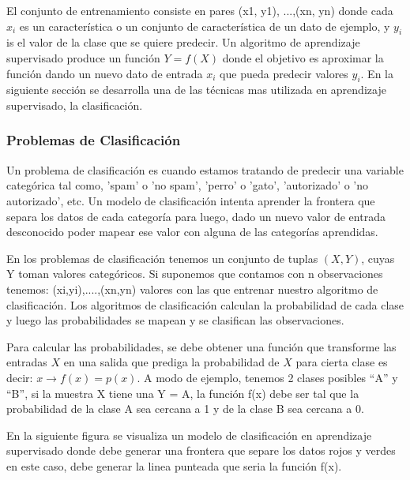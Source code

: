 El conjunto de entrenamiento consiste en pares (x1, y1), ...,(xn, yn) donde cada $x_i$  es un característica o un conjunto de característica de un dato de ejemplo, y $y_i$ is el valor de la clase que se quiere predecir. Un algoritmo de aprendizaje supervisado produce un función $Y = f(X)$ donde el objetivo es aproximar la función dando un nuevo dato de entrada $x_i$ que pueda predecir valores $y_i$. En la siguiente sección se desarrolla una de las técnicas mas utilizada en aprendizaje supervisado, la clasificación.


\subsubsection{Problemas de Clasificación}

Un problema de clasificación es cuando estamos tratando de predecir una variable categórica tal como, 'spam' o 'no spam', 'perro' o 'gato', 'autorizado' o 'no autorizado', etc. Un modelo de clasificación intenta aprender la frontera que separa los datos de cada categoría para luego, dado un nuevo valor de entrada desconocido poder mapear ese valor con alguna de las categorías aprendidas.

En los problemas de clasificación tenemos un conjunto de tuplas $(X,Y)$, cuyas Y toman valores categóricos. Si suponemos que contamos con n observaciones tenemos: (xi,yi),....,(xn,yn) valores con las que entrenar nuestro algoritmo de clasificación. Los algoritmos de clasificación  calculan la probabilidad de cada clase y luego las probabilidades se mapean y se clasifican las observaciones.

Para calcular las probabilidades, se debe obtener una función que transforme las entradas $X$ en una salida que prediga la probabilidad de $X$ para cierta clase es decir: $ x \longrightarrow f(x) = p(x) $. A modo de ejemplo,  tenemos 2 clases posibles “A” y “B”, si la muestra X tiene una Y = A, la función f(x) debe ser tal que la probabilidad de la clase A sea cercana a 1 y  de la clase B sea cercana a 0.

En la siguiente figura se visualiza un modelo de clasificación en aprendizaje supervisado donde debe generar una frontera que separe los datos rojos y verdes en este caso, debe generar la linea punteada que seria la función f(x).


